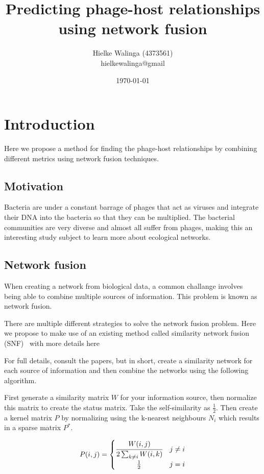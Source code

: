 \documentclass{article}
\title{Predicting phage-host relationships using network fusion}
\author{Hielke Walinga (4373561) \\ hielkewalinga@gmail}
\date{\today}
\begin{document}
\maketitle

\section{Introduction}

Here we propose a method for finding the phage-host relationships 
by combining different metrics using network fusion techniques.

\subsection{Motivation}

Bacteria are under a constant barrage of phages that act as viruses and
integrate their DNA into the bacteria so that they can be multiplied. 
The bacterial communities are very diverse and almost all suffer from
phages, making this an interesting study subject to learn more about
ecological networks.

\subsection{Network fusion}

When creating a network from biological data, a common challange involves
being able to combine multiple sources of information. This problem is
known as network fusion. 

There are multiple different strategies to solve the network fusion problem. 
Here we propose to make use of an existing method called 
similarity network fusion (SNF)~\cite{wang2014similarity}
with more details here~\cite{wang2012unsupervised}

For full details, consult the papers, but in short, create a similarity network
for each source of information and then combine the networks using the 
following algorithm.

First generate a similarity matrix $W$ for your information source, 
then normalize this matrix to create the status matrix. Take the 
self-similarity as $\frac{1}{2}$. Then create
a kernel matrix $P$ by normalizing using the k-nearest neighbours $N_i$ which 
results in a sparse matrix $P^*$.

\begin{equation}
    P(i, j) = 
    \begin{cases}
        \cfrac{W(i, j)}{2 \sum_{k \neq i}W(i, k)} & j \neq i \\
        \hfil \frac{1}{2} & j = i
    \end{cases}
\end{equation}
\end{document}
